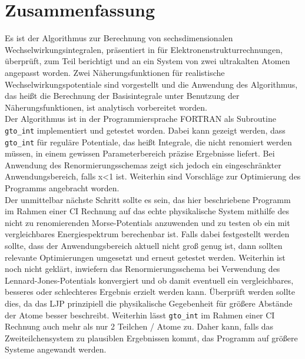 \chapter{Zusammenfassung}

Es ist der Algorithmus zur Berechnung von sechsdimensionalen 
Wechselwirkungsintegralen, präsentiert in \cite{av:1a} für 
Elektronenstrukturrechnungen, überprüft, zum Teil berichtigt 
und an ein System von zwei ultrakalten Atomen angepasst 
worden. Zwei Näherungsfunktionen für realistische 
Wechselwirkungspotentiale sind vorgestellt und die Anwendung 
des Algorithmus, das heißt die Berechnung der Basisintegrale 
unter Benutzung der Näherungsfunktionen, ist analytisch 
vorbereitet worden. \\
Der Algorithmus ist in der Programmiersprache FORTRAN als 
Subroutine \texttt{gto\_int} implementiert und getestet 
worden. Dabei kann gezeigt werden, dass \texttt{gto\_int} für 
reguläre Potentiale, das heißt Integrale, die nicht renomiert 
werden müssen, in einem gewissen Parameterbereich präzise 
Ergebnisse liefert. Bei Anwendung des Renormierungsschemas 
zeigt sich jedoch ein  eingeschränkter Anwendungsbereich, 
falls x<1 ist. 
Weiterhin sind Vorschläge zur Optimierung des 
Programms angebracht worden.\\

Der unmittelbar nächste Schritt sollte es sein, das hier 
beschriebene Programm 
im Rahmen einer CI Rechnung auf das echte physikalische 
System mithilfe des nicht zu renomierenden Morse-Potentials 
anzuwenden und zu testen ob ein mit \cite{phdthesis:sergey} 
vergleichbares Energiespektrum berechenbar ist. Falls dabei 
festgestellt werden sollte, dass der 
Anwendungsbereich aktuell nicht groß genug ist, dann sollten  
relevante Optimierungen umgesetzt und erneut getestet werden. 
Weiterhin ist noch nicht geklärt, inwiefern das 
Renormierungsschema bei Verwendung des 
Lennard-Jones-Potentials konvergiert und ob damit eventuell 
ein vergleichbares, besseres oder schlechteres Ergebnis 
erzielt werden kann. Überprüft werden sollte dies, da das LJP 
prinzipiell die physikalische Gegebenheit für größere 
Abstände der Atome besser beschreibt. 
Weiterhin lässt \texttt{gto\_int} im Rahmen einer CI Rechnung 
auch mehr als nur 2 
Teilchen / Atome zu. Daher kann, falls das Zweiteilchensystem 
zu plausiblen Ergebnissen kommt, das Programm auf größere 
Systeme angewandt werden. 

